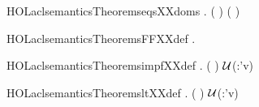 \newcommand{\HOLaclsemanticsTheoremseqsXXdef}{\UseVerbatim{HOLaclsemanticsTheoremseqsXXdef}}
\begin{SaveVerbatim}{HOLaclsemanticsTheoremseqsXXdoms}
\HOLTokenTurnstile{} \HOLSymConst{\HOLTokenForall{}}  .
         (  ) \HOLSymConst{=}
         (      )
\end{SaveVerbatim}
\newcommand{\HOLaclsemanticsTheoremseqsXXdoms}{\UseVerbatim{HOLaclsemanticsTheoremseqsXXdoms}}
\begin{SaveVerbatim}{HOLaclsemanticsTheoremsFFXXdef}
\HOLTokenTurnstile{} \HOLSymConst{\HOLTokenForall{}}  .      \HOLSymConst{=} \HOLTokenLeftbrace{}\HOLTokenRightbrace{}
\end{SaveVerbatim}
\newcommand{\HOLaclsemanticsTheoremsFFXXdef}{\UseVerbatim{HOLaclsemanticsTheoremsFFXXdef}}
\begin{SaveVerbatim}{HOLaclsemanticsTheoremsimpfXXdef}
\HOLTokenTurnstile{} \HOLSymConst{\HOLTokenForall{}}    .
         (  ) \HOLSymConst{=}
     \ensuremath{\cal{U}}(:'v)       \HOLConst{\HOLTokenUnion{}}     
\end{SaveVerbatim}
\newcommand{\HOLaclsemanticsTheoremsimpfXXdef}{\UseVerbatim{HOLaclsemanticsTheoremsimpfXXdef}}
\begin{SaveVerbatim}{HOLaclsemanticsTheoremsltXXdef}
\HOLTokenTurnstile{} \HOLSymConst{\HOLTokenForall{}}    .
         (  ) \HOLSymConst{=}
       \HOLSymConst{\HOLTokenLt{}}   \ensuremath{\cal{U}}(:'v)  \HOLTokenLeftbrace{}\HOLTokenRightbrace{}
\end{SaveVerbatim}
